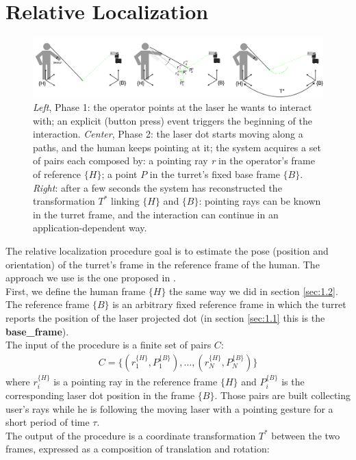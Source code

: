 \section{Relative Localization} \label{sec:relloc}
\begin{figure}
	\centering
	\includegraphics[width=\textwidth]{img/pointingRelloc.png}%
	\caption[Relloc Model]{\emph{Left}, Phase 1: the operator points at the laser he wants to interact with; an explicit (button press) event triggers the beginning of the interaction. \emph{Center}, Phase 2: the laser dot starts moving along a paths, and the human keeps pointing at it; the system acquires a set of pairs each composed by: a pointing ray \emph{r} in the operator’s frame of reference $\{H\}$; a point $P$ in the turret’s fixed base frame $\{B\}$. \emph{Right}: after a few seconds the system has reconstructed the transformation $T^*$ linking $\{H\}$ and $\{B\}$: pointing rays can be known in the turret frame, and the interaction can continue in an application-dependent way.}
	\label{fig:rellocExplained}
\end{figure}
The relative localization procedure goal is to estimate the pose (position and orientation) of the turret's frame in the reference frame of the human. The approach we use is the one proposed in \cite{gromov2018robot}.\\
First, we define the human frame $\{H\}$ the same way we did in section \ref{sec:1.2}. The reference frame $\{B\}$ is an arbitrary fixed reference frame in which the turret reports the position of the laser projected dot (in section \ref{sec:1.1} this is the \textbf{base\_frame}).\\ The input of the procedure is a finite set of pairs $C$:
\begin{align}
    C=\{(r_1^{\{H\}},P_1^{\{B\}}), \dots,(r_N^{\{H\}},P_N^{\{B\}})\}\nonumber
\end{align}
where $r_i^{\{H\}}$ is a pointing ray in the reference frame $\{H\}$ and $P_i^{\{B\}}$ is the corresponding laser dot position in the frame $\{B\}$. Those pairs are built collecting user's rays while he is following the moving laser with a pointing gesture for a short period of time $\tau$.\\
The output of the procedure is a coordinate transformation $T^*$ between the two frames, expressed as a composition of translation and rotation: 
